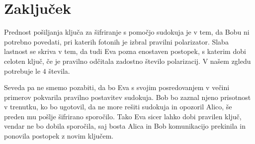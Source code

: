 \documentclass[A4paper, 11pt]{article}
\begin{document}

\section{Zaključek}

Prednost pošiljanja ključa za šifriranje s pomočjo sudokuja je v tem, da Bobu ni potrebno povedati, pri katerih fotonih je izbral pravilni polarizator. Slaba lastnost se skriva v tem, da tudi Eva pozna enostaven postopek, s katerim dobi celoten ključ, če je pravilno odčitala zadostno število polarizacij. V našem zgledu potrebuje le $4$ števila.

Seveda pa ne smemo pozabiti, da bo Eva s svojim posredovanjem v večini primerov pokvarila pravilno postavitev sudokuja. Bob bo zaznal njeno prisotnost v trenutku, ko bo ugotovil, da ne more rešiti sudokuja in opozoril Alico, še preden mu pošlje šifrirano sporočilo. Tako Eva sicer lahko dobi pravilen ključ, vendar ne bo dobila sporočila, saj bosta Alica in Bob komunikacijo prekinila in ponovila postopek z novim ključem. 

\pagebreak

\end{document}
